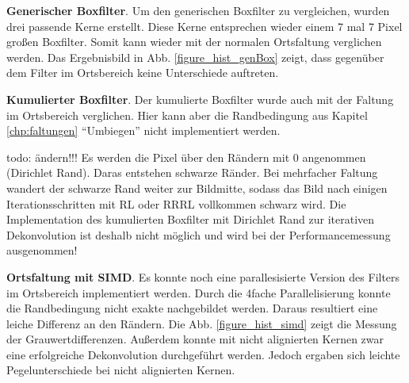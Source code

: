 \documentclass[a4paper,12pt]{article}
\begin{document}
\textbf{Generischer Boxfilter}. Um den generischen Boxfilter zu vergleichen,
wurden drei passende Kerne erstellt. Diese Kerne entsprechen wieder einem 7 mal
7 Pixel großen Boxfilter. Somit kann wieder mit der normalen Ortsfaltung
verglichen werden. Das Ergebnisbild in Abb. \ref{figure_hist_genBox} zeigt, dass
gegenüber dem Filter im Ortsbereich keine Unterschiede auftreten.

\textbf{Kumulierter Boxfilter}. Der kumulierte Boxfilter wurde auch mit der
Faltung im Ortsbereich verglichen. Hier kann aber die Randbedingung aus
Kapitel \ref{chp:faltungen} "`Umbiegen"' nicht implementiert werden. 

todo: ändern!!!
Es werden
die Pixel über den Rändern mit 0 angenommen (Dirichlet Rand). Daras entstehen
schwarze Ränder. Bei mehrfacher Faltung wandert der schwarze Rand weiter zur
Bildmitte, sodass das Bild nach einigen Iterationsschritten mit RL oder RRRL
vollkommen schwarz wird. Die Implementation des kumulierten Boxfilter mit Dirichlet Rand
zur iterativen Dekonvolution ist deshalb nicht möglich und wird bei der
Performancemessung ausgenommen!

\textbf{Ortsfaltung mit SIMD}. Es konnte noch eine parallesisierte
Version des Filters im Ortsbereich implementiert werden. Durch die 4fache
Parallelisierung konnte die Randbedingung nicht exakte nachgebildet werden.
Daraus resultiert eine leiche Differenz an den Rändern. Die Abb. \ref{figure_hist_simd} zeigt
die Messung der Grauwertdifferenzen. Außerdem konnte mit nicht alignierten
Kernen zwar eine erfolgreiche Dekonvolution durchgeführt werden. Jedoch ergaben
sich leichte Pegelunterschiede bei nicht alignierten Kernen.


  
\end{document}
